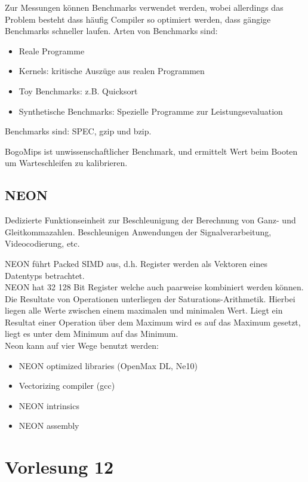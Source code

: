 \documentclass[a4paper,12pt,leqno]{article}
\begin{document}
Zur Messungen können Benchmarks verwendet werden, wobei allerdings das Problem besteht dass häufig Compiler so optimiert werden, dass gängige Benchmarks schneller laufen. Arten von Benchmarks sind:
\begin{itemize}
\item Reale Programme
\item Kernels: kritische Auszüge aus realen Programmen
\item Toy Benchmarks: z.B. Quicksort
\item Synthetische Benchmarks: Spezielle Programme zur Leistungsevaluation
\end{itemize}

Benchmarks sind: SPEC, gzip und bzip.

BogoMips ist unwissenschaftlicher Benchmark, und ermittelt Wert beim Booten um Warteschleifen zu kalibrieren.

\subsection{NEON}

Dedizierte Funktionseinheit zur Beschleunigung der Berechnung von Ganz- und Gleitkommazahlen.
Beschleunigen Anwendungen der Signalverarbeitung, Videocodierung, etc.

NEON führt Packed SIMD aus, d.h. Register werden als Vektoren eines Datentyps betrachtet.\\
NEON hat 32 128 Bit Register welche auch paarweise kombiniert werden können.\\

Die Resultate von Operationen unterliegen der Saturations-Arithmetik.  Hierbei liegen alle Werte zwischen einem maximalen und minimalen Wert. Liegt ein Resultat einer Operation über dem Maximum wird es auf das Maximum gesetzt, liegt es unter dem Minimum auf das Minimum.\\

Neon kann auf vier Wege benutzt werden:
\begin{itemize}
\item NEON optimized libraries (OpenMax DL, Ne10)
\item Vectorizing compiler (gcc)
\item NEON intrinsics
\item NEON assembly
\end{itemize}

\section{Vorlesung 12}
\end{document}
